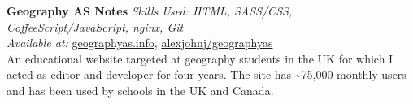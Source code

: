 \textbf{Geography AS Notes}  \newline
\textit{Skills Used: HTML, SASS/CSS, CoffeeScript/JavaScript, nginx, Git}\\
\textit{Available at:} \href{https://geographyas.info}{geographyas.info}, \href{https://github.com/\myweb/geographyas}{alexjohnj/geographyas} \\
An educational website targeted at geography students in the UK for which I
acted as editor and developer for four years. The site has
\textasciitilde{}75,000 monthly users and has been used by schools in the UK and
Canada.

